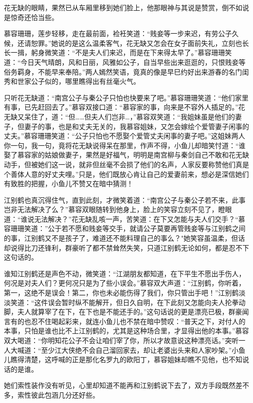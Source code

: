 \documentclass[12pt,oneside]{book}
\begin{document}
花无缺的眼睛，果然已从车厢里移到她们脸上，他那眼神与其说是赞赏，倒不如说是惊奇还恰当些。

慕容珊珊，莲步轻移，走在最前面，裣衽笑道：``贱妾等一步来迟，有劳公子久候，还请恕罪。''她说的是这么温柔客气，花无缺又怎会在女子面前失礼，立刻也长长一揖，躬身微笑道：``不是夫人们来迟，而是在下来得太早了。''慕容珊珊笑道：``今日天气晴朗，风和日丽，风雅如公子，自当早些出来逛逛的，只恨贱妾等俗务羁身，不能早来奉陪。''两人嫣然笑语，竟真的像是早巳约好出来游春的名门闺秀和世家公子似的，哪里瞧得出有丝毫火气。

只听花无缺道：``南宫公子与秦公子只怕也快要来了吧。''慕容珊珊笑道：``他们家里有事，已先赶回去了。''慕容双接口道：``慕容家的事，向来是不容外人插足的。''花无缺又呆住了，道：``但\ldots\ldots 但夫人们岂非\ldots，''慕容双笑道：``我姐妹虽是他们的妻子，但妻子的事，也是和丈夫无关的，我慕容姐妹，又怎会嫁绘个爱管妻子闲事的丈夫。''慕容珊珊笑道：``公子只怕也不愿娶个爱管丈夫闲事的妻子吧。''这姐妹两人你一句，我一句，竟将花无缺说得呆在那里，作声不得，小鱼儿却暗笑忖道：``谁娶了慕容家的姑娘做妻子，果然是好福气，明明是南宫柳与秦剑自己不敢和花无缺动手，但被她们这一说，就非但丝毫不会损了他们的名声，人家反要称赞他们真是个善体人意的好丈夫哩。''只是，他们既放心肯让自己的爱妻前来，想必是深信她们有致胜的把握，小鱼儿不赞又在暗中猜测！

江别鹤也真沉得住气，直到此刻，才微笑着道：``南宫公子与秦公子若不来，此事岂非无法解决了么？''慕容双眼随转到他身上，脸上的笑容立刻不见了，瞪眼道：``谁说无法解决？''花无缺乱咳一声，苦笑道：在下又怎能与夫人们交手？``慕容珊珊笑道：''公于若不愿和贱妾等交手，就请公子莫要再管贱妾等与江别鹤之间的事，江别鹤又不是孩子了，难道还不能料理自己的事么？"她笑容虽温柔，但话却说得比刀还锋利，群豪听了都不禁耸然失笑，只道江别鹤无论如何，都是忍不下这句话的。

谁知江别鹤还是声色不动，微笑道：``江湖朋友都知道，在下平生不愿出手伤人，何况是对夫人们？更何况只是为了些小误会。''慕容双大声道：``江别鹤，你听着，第一，这绝不是误会！第二，你也未必能伤得了我们，你只管出手吧！''江别鹤淡淡笑道：``这件误会暂时纵不能解开，但日久自明，在下此刻又怎能向夫人抡拳动脚，夫人就算宰了在下，在下也是不能还手的。''这句话说的更是漂亮已极，群豪闻言有的也忍不住喝起彩来，就连小鱼儿也不禁在暗中赞叹：``普天之下，对付人的本事，只怕是谁也比不上江别鹤的，尤其是这种场合里，才显得出他的本事。''慕容双大喝道：``你明知花公子不会让咱们宰了你，所以才故意说这种漂亮话。''突听一人大喊道：``至少江大侠绝不会自己溜回家去，却让老婆出头来和人家吵架。''小鱼儿瞧得清楚，这呼喊的正是那化名罗九的欧阳丁，慕容姐妹却瞧不见他，也不知说话的是谁。

她们索性装作没有听见，心里却知道不能再和江别鹤说下去了，双方手段既然差不多，索性彼此包涵几分还好些。
\end{document}
